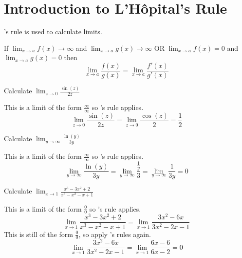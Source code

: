 \section*{Introduction to L'H\^opital's Rule}

\lhopital's rule is used to calculate limits.

\vspace{\baselineskip}
\noindent If $\displaystyle{\lim_{x\to a} f(x)\to\infty}$ and $\displaystyle{\lim_{x\to a} g(x)\to\infty}$ OR $\displaystyle{\lim_{x\to a} f(x)=0}$ and $\displaystyle{\lim_{x\to a} g(x)=0}$   then
$$\lim_{x\to a} \frac{f(x)}{g(x)} = \lim_{x\to a} \frac{f'(x)}{g'(x)}$$ 

\printanswers
\begin{questions}
\question
Calculate
$\displaystyle{\lim_{z\to 0} \frac{\sin(z)}{2z}}$
\begin{solution}[1.5in]
  This is a limit of the form $\frac{\infty}{\infty}$ so \lhopital's rule applies.
  $$\lim_{z\to 0} \frac{\sin(z)}{2z} = \lim_{z\to 0} \frac{\cos(z)}{2} = \frac{1}{2}$$
\end{solution}
\question
Calculate $\displaystyle{\lim_{y\to \infty} \frac{\ln(y)}{3y}}$
\begin{solution}[1.5in]
  This is a limit of the form $\frac{\infty}{\infty}$ so \lhopital's rule applies.
  $$\lim_{y\to \infty} \frac{\ln(y)}{3y}=\lim_{y\to \infty} \frac{\frac{1}{y}}{3} = \lim_{y\to \infty} \frac{1}{3y} = 0$$
\end{solution}
\question
Calculate  $\displaystyle{\lim_{x\to 1} \frac{x^3-3x^2+2}{x^3-x^2-x+1}}$
\begin{solution}[1.5in]
  This is a limit of the form $\frac{0}{0}$ so \lhopital's rule applies.
  $$\lim_{x\to 1} \frac{x^3-3x^2+2}{x^3-x^2-x+1} = \lim_{x\to 1} \frac{3x^2-6x}{3x^2-2x-1} $$
  This is still of the form $\frac{0}{0}$, so apply \lhopital's rules again.
  $$\lim_{x\to 1} \frac{3x^2-6x}{3x^2-2x-1} = \lim_{x\to 1} \frac{6x-6}{6x-2} = 0 $$
\end{solution}
\question
{}
\end{questions}
